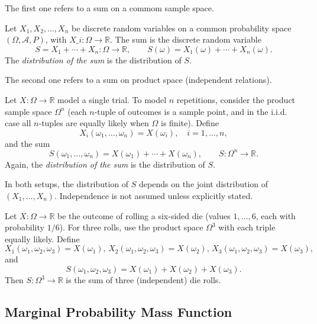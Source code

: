 The first one refers to a sum on a commom sample space.

\begin{definition}
Let $X_1, X_2, \ldots, X_n$ be discrete random variables on a common probability space $(\Omega,\mathcal{A},P)$, with $X\_i:\Omega \to \mathbb{R}$. The sum is the discrete random variable
\[
S = X_1 + \cdots + X_n : \Omega \to \mathbb{R}, 
\qquad
S(\omega)=X_1(\omega)+\cdots+X_n(\omega).
\]
The \emph{distribution of the sum} is the distribution of $S$.
\end{definition}

The second one refers to a sum on  product space (independent relations).

\begin{definition}
Let $X:\Omega \to \mathbb{R}$ model a single trial. To model $n$ repetitions, consider the product sample space $\Omega^n$ (each $n$-tuple of outcomes is a sample point, and in the i.i.d. case all $n$-tuples are equally likely when $\Omega$ is finite). Define
\[
X_i(\omega_1,\ldots,\omega_n)=X(\omega_i), \quad i=1,\ldots,n,
\]
and the sum
\[
S(\omega_1,\ldots,\omega_n)=X(\omega_1)+\cdots+X(\omega_n), \qquad S:\Omega^n\to\mathbb{R}.
\]
Again, the \emph{distribution of the sum} is the distribution of $S$.
\end{definition}

In both setups, the distribution of $S$ depends on the joint distribution of $(X_1, \ldots, X_n)$. Independence is not assumed unless explicitly stated.

\begin{example}
Let $X:\Omega \to \mathbb{R}$ be the outcome of rolling a six-sided die (values ${1, \ldots, 6}$, each with probability $1/6$). For three rolls, use the product space $\Omega^3$ with each triple equally likely. Define
\[
X_1(\omega_1,\omega_2,\omega_3)=X(\omega_1),\,
X_2(\omega_1,\omega_2,\omega_3)=X(\omega_2),\,
X_3(\omega_1,\omega_2,\omega_3)=X(\omega_3),
\]
and
\[
S(\omega_1,\omega_2,\omega_3)=X(\omega_1)+X(\omega_2)+X(\omega_3).
\]
Then $S:\Omega^3 \to \mathbb{R}$ is the sum of three (independent) die rolls.
\end{example}


\subsection{Marginal Probability Mass Function}

